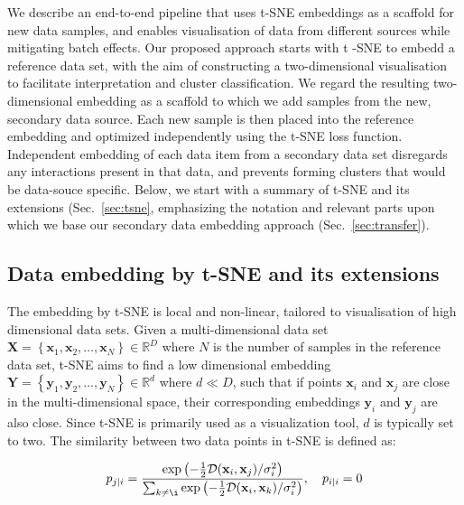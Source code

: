 \documentclass[runningheads]{llncs}
\begin{document}
We describe an end-to-end pipeline that uses t-SNE embeddings as a scaffold for
new data samples, and enables visualisation of data from different sources
while mitigating batch effects. Our proposed approach starts with t\nobreakdash
-SNE to embedd a reference data set, with the aim of constructing a
two-dimensional visualisation to facilitate interpretation and cluster
classification. We regard the resulting two-dimensional embedding as a scaffold
to which we add samples from the new, secondary data source. Each new sample is
then placed into the reference embedding and optimized independently using the
t\nobreakdash -SNE loss function. Independent embedding of each data item from
a secondary data set disregards any interactions present in that data, and
prevents forming clusters that would be data-souce specific. Below, we start
with a summary of t-SNE and its extensions (Sec.~\ref{sec:tsne}, emphasizing
the notation and relevant parts upon which we base our secondary data embedding
approach (Sec.~\ref{sec:transfer}).


\subsection{Data embedding by t-SNE and its extensions\label{sec:tsne}}

The embedding by t-SNE is local and non-linear, tailored to visualisation of
high dimensional data sets. Given a multi-dimensional data set $\mathbf{X} =
\left \{ \mathbf{x}_1, \mathbf{x}_2, \dots, \mathbf{x}_N \right \} \in
\mathbb{R}^D$ where $N$ is the number of samples in the reference data set,
t-SNE aims to find a low dimensional embedding $\mathbf{Y} = \left \{
\mathbf{y}_1, \mathbf{y}_2, \dots, \mathbf{y}_N \right \} \in \mathbb{R}^d$
where $d \ll D$, such that if points $\mathbf{x}_i$ and $\mathbf{x}_j$ are
close in the multi-dimensional space, their corresponding embeddings
$\mathbf{y}_i$ and $\mathbf{y}_j$ are also close. Since t-SNE is primarily used
as a visualization tool, $d$ is typically set to two. The similarity between
two data points in t-SNE is defined as:

\begin{equation}
p_{j \mid i} = \frac{\exp \left ( -\frac{1}{2} \mathcal{D}(\mathbf{x}_i, \mathbf{x}_j ) / \sigma_i^2 \right )}
{\sum_{k \neq \i } \exp \left ( -\frac{1}{2} \mathcal{D}(\mathbf{x}_i, \mathbf{x}_k ) / \sigma_i^2 \right )}, \quad p_{i \mid i} = 0
\label{eq:gaussian_kernel}
\end{equation}
\end{document}
